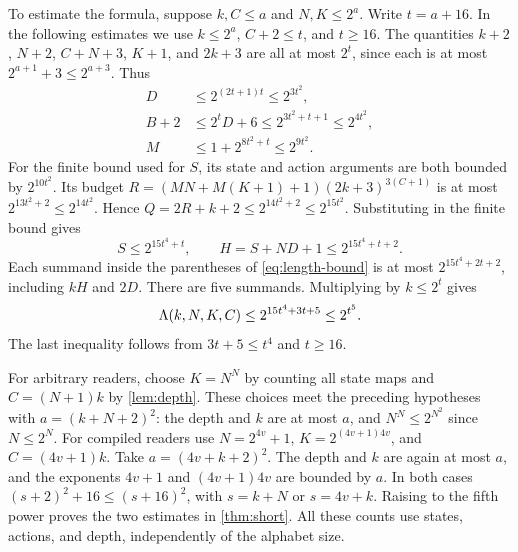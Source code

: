 To estimate the formula, suppose $k,C\le a$ and $N,K\le 2^a$.
Write $t=a+16$. In the following estimates we use $k\le 2^a$,
$C+2\le t$, and $t\ge16$. The quantities $k+2$, $N+2$,
$C+N+3$, $K+1$, and $2k+3$ are all at most $2^t$, since each
is at most $2^{a+1}+3\le 2^{a+3}$. Thus
\begin{align*}
 D &\le 2^{(2t+1)t} \le 2^{3t^2},\\
 B+2 &\le 2^t D + 6 \le 2^{3t^2+t+1}\le 2^{4t^2},\\
 M &\le 1+2^{8t^2+t} \le 2^{9t^2}.
\end{align*}
For the finite bound used for $S$, its state and action arguments
are both bounded by $2^{10t^2}$. Its budget
$R=(MN+M(K+1)+1)(2k+3)^{3(C+1)}$ is at most
$2^{13t^2+2}\le 2^{14t^2}$. Hence
$Q=2R+k+2\le 2^{14t^2+2}\le 2^{15t^2}$.
Substituting in the finite bound gives
\[
       S\le 2^{15t^4+t},
       \qquad H=S+ND+1\le 2^{15t^4+t+2}.
\]
Each summand inside the parentheses of \eqref{eq:length-bound}
is at most $2^{15t^4+2t+2}$, including $kH$ and $2D$.
There are five summands. Multiplying by $k\le 2^t$ gives
\[
      \Lambda(k,N,K,C) \le 2^{15t^4+3t+5}\le 2^{t^5}.
\]
The last inequality follows from $3t+5\le t^4$ and $t\ge16$.

For arbitrary readers, choose $K=N^N$ by counting all state maps
and $C=(N+1)k$ by \cref{lem:depth}. These choices meet the preceding
hypotheses with $a=(k+N+2)^2$: the depth and $k$ are at most $a$,
and $N^N\le 2^{N^2}$ since $N\le 2^N$. For compiled readers use
$N=2^{4v}+1$, $K=2^{(4v+1)4v}$, and $C=(4v+1)k$.
Take $a=(4v+k+2)^2$. The depth and $k$ are again at most $a$,
and the exponents $4v+1$ and $(4v+1)4v$ are bounded by $a$.
In both cases $(s+2)^2+16\le(s+16)^2$, with $s=k+N$ or
$s=4v+k$. Raising to the fifth power proves the two estimates
in \cref{thm:short}. All these counts use states, actions, and
depth, independently of the alphabet size.

